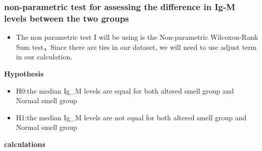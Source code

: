 \documentclass[]{article}
\newenvironment{Shaded}{\begin{snugshade}}{\end{snugshade}}
\newcommand{\DataTypeTok}[1]{\textcolor[rgb]{0.13,0.29,0.53}{#1}}
\newcommand{\DecValTok}[1]{\textcolor[rgb]{0.00,0.00,0.81}{#1}}
\newcommand{\KeywordTok}[1]{\textcolor[rgb]{0.13,0.29,0.53}{\textbf{#1}}}
\newcommand{\NormalTok}[1]{#1}
\newcommand{\OperatorTok}[1]{\textcolor[rgb]{0.81,0.36,0.00}{\textbf{#1}}}
\newcommand{\OtherTok}[1]{\textcolor[rgb]{0.56,0.35,0.01}{#1}}
\newcommand{\StringTok}[1]{\textcolor[rgb]{0.31,0.60,0.02}{#1}}
\providecommand{\tightlist}{%
  \setlength{\itemsep}{0pt}\setlength{\parskip}{0pt}}
\begin{document}
\begin{Shaded}
\end{Shaded}

\hypertarget{non-parametric-test-for-assessing-the-difference-in-ig-m-levels-between-the-two-groups}{%
\subsubsection{non-parametric test for assessing the difference in Ig-M
levels between the two
groups}\label{non-parametric-test-for-assessing-the-difference-in-ig-m-levels-between-the-two-groups}}

\begin{itemize}
\tightlist
\item
  The non parametric test I will be using is the Non-parametric
  Wilcoxon-Rank Sum test，Since there are ties in our dataset, we will
  need to use adjust term in our calculation.
\end{itemize}

\textbf{Hypothesis}

\begin{itemize}
\item
  H0:the median Ig\_M levels are equal for both altered smell group and
  Normal smell group
\item
  H1:the median Ig\_M levels are not equal for both altered smell group
  and Normal smell group
\end{itemize}

\textbf{calculations}

\begin{Shaded}
\end{Shaded}
\end{document}

